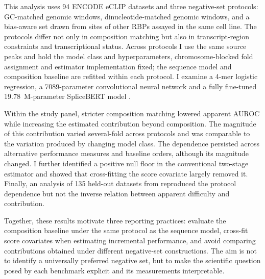 This analysis uses 94 ENCODE eCLIP datasets and three negative-set protocols: GC-matched
genomic windows, dinucleotide-matched genomic windows, and a bias-aware set drawn from sites of
other RBPs assayed in the same cell line. The protocols differ not only in composition matching
but also in transcript-region constraints and transcriptional status. Across protocols I use
the same source peaks and hold the model class and hyperparameters, chromosome-blocked fold
assignment and estimator implementation fixed; the sequence model and composition baseline are refitted within each
protocol. I examine a 4-mer logistic regression, a 7089-parameter convolutional neural network
and a fully fine-tuned 19.78~M-parameter SpliceBERT model \citep{chen2024}.

Within the study panel, stricter composition matching lowered apparent AUROC while increasing the
estimated contribution beyond composition. The magnitude of this contribution varied
several-fold across protocols and was comparable to the variation produced by changing model class.
The dependence persisted across alternative performance measures and baseline orders, although
its magnitude changed. I further identified a positive null floor in the conventional
two-stage estimator and showed that cross-fitting the score covariate largely removed it.
Finally, an analysis of 135 held-out datasets from \citet{horlacher2023} reproduced the
protocol dependence but not the inverse relation between apparent difficulty and contribution.

Together, these results motivate three reporting practices: evaluate the composition baseline
under the same protocol as the sequence model, cross-fit score covariates when estimating
incremental performance, and avoid comparing contributions obtained under different
negative-set constructions. The aim is not to identify a universally preferred negative set,
but to make the scientific question posed by each benchmark explicit and its measurements
interpretable.
